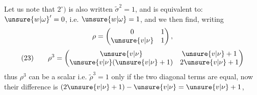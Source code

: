 
Let us note that $2^\circ)$ is also written $\widetilde\sigma^2=1$, and is equivalent to: $\unsure{w|\omega}'=0$, i.e. $\unsure{w|\omega}=1$, and we then find, writing \deleted{\unsure{$\rho=$}} 
\[
\rho=\begin{pmatrix}0&1\\\unsure{v|\nu}&1\end{pmatrix},
\]
\[
(23)\qquad
\rho^3=\begin{pmatrix}\unsure{v|\nu}&\unsure{v|\nu}+1\\\unsure{v|\nu}(\unsure{v|\nu}+1)&2\unsure{v|\nu}+1\end{pmatrix}
\]
thus $\rho^3$ can be a scalar i.e. $\widetilde\rho^3=1$ only if the two diagonal terms are equal, now their difference is $(2\unsure{v|\nu}+1)-\unsure{v|\nu}=\unsure{v|\nu}+1$,


